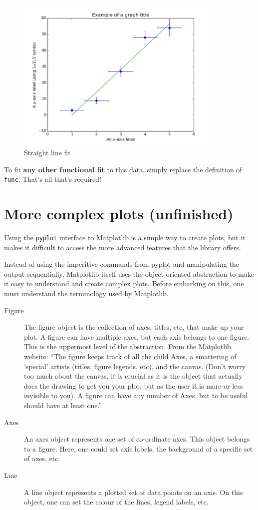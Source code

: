 \documentclass{article}
\begin{document}
\begin{figure}[H]
  \centering
  \includegraphics[width=10cm]{ch4}
  \caption{Straight line fit}
  \label{fig:ch4}
\end{figure}

To fit \textbf{any other functional fit} to this data, simply replace
the definition of \texttt{func}. That's all that's required!

\section{More complex plots (unfinished)}
Using the \texttt{pyplot} interface to Matplotlib is a simple way to
create plots, but it makes it difficult to access the more advanced
features that the library offers.

Instead of using the imperitive commands from pyplot and manipulating
the output sequentially, Matplotlib itself uses the object-oriented
abstraction to make it easy to understand and create complex
plots. Before embarking on this, one must understand the terminology
used by Matplotlib.

\begin{description}
\item [Figure] The figure object is the collection of axes, titles,
  etc, that make up your plot. A figure can have multiple axes, but
  each axis belongs to one figure. This is the uppermost level of the
  abstraction. From the Matplotlib website: ``The figure keeps track
  of all the child Axes, a smattering of ‘special’ artists (titles,
  figure legends, etc), and the canvas. (Don’t worry too much about
  the canvas, it is crucial as it is the object that actually does the
  drawing to get you your plot, but as the user it is more-or-less
  invisible to you). A figure can have any number of Axes, but to be
  useful should have at least one.''
\item [Axes] An axes object represents one set of co-ordinate
  axes. This object belongs to a figure. Here, one could set axis
  labels, the background of a specific set of axes, etc.
\item [Line] A line object represents a plotted set of data points on
  an axis. On this object, one can set the colour of the lines, legend
  labels, etc.
\end{description}
\end{document}

